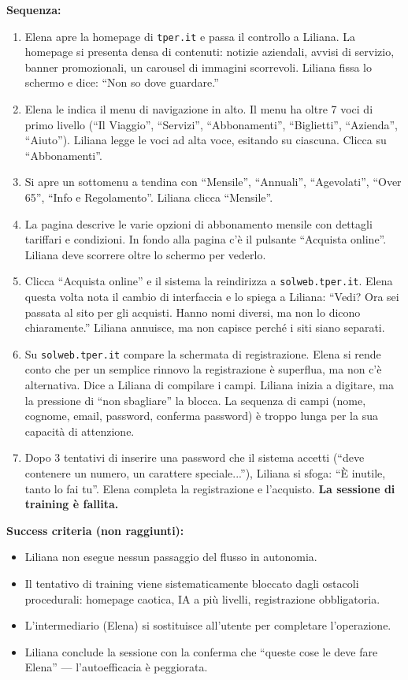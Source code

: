 \documentclass[11pt,a4paper]{article}
\begin{document}
\begin{tcolorbox}[colback=backgroundColor,colframe=borderColor,arc=2mm]
{    \textbf{Sequenza:}
    \begin{enumerate}
        \item Elena apre la homepage di \texttt{tper.it} e passa il controllo a Liliana. La homepage si presenta densa di contenuti: notizie aziendali, avvisi di servizio, banner promozionali, un carousel di immagini scorrevoli. Liliana fissa lo schermo e dice: ``Non so dove guardare.''
        \item Elena le indica il menu di navigazione in alto. Il menu ha oltre 7 voci di primo livello (``Il Viaggio'', ``Servizi'', ``Abbonamenti'', ``Biglietti'', ``Azienda'', ``Aiuto''). Liliana legge le voci ad alta voce, esitando su ciascuna. Clicca su ``Abbonamenti''.
        \item Si apre un sottomenu a tendina con ``Mensile'', ``Annuali'', ``Agevolati'', ``Over 65'', ``Info e Regolamento''. Liliana clicca ``Mensile''.
        \item La pagina descrive le varie opzioni di abbonamento mensile con dettagli tariffari e condizioni. In fondo alla pagina c'è il pulsante ``Acquista online''. Liliana deve scorrere oltre lo schermo per vederlo.
        \item Clicca ``Acquista online'' e il sistema la reindirizza a \texttt{solweb.tper.it}. Elena questa volta nota il cambio di interfaccia e lo spiega a Liliana: ``Vedi? Ora sei passata al sito per gli acquisti. Hanno nomi diversi, ma non lo dicono chiaramente.'' Liliana annuisce, ma non capisce perché i siti siano separati.
        \item Su \texttt{solweb.tper.it} compare la schermata di registrazione. Elena si rende conto che per un semplice rinnovo la registrazione è superflua, ma non c'è alternativa. Dice a Liliana di compilare i campi. Liliana inizia a digitare, ma la pressione di ``non sbagliare'' la blocca. La sequenza di campi (nome, cognome, email, password, conferma password) è troppo lunga per la sua capacità di attenzione.
        \item Dopo 3 tentativi di inserire una password che il sistema accetti (``deve contenere un numero, un carattere speciale...''), Liliana si sfoga: ``È inutile, tanto lo fai tu''. Elena completa la registrazione e l'acquisto. \textbf{La sessione di training è fallita.}
    \end{enumerate}

    \textbf{Success criteria (non raggiunti):}
    \begin{itemize}
        \item Liliana non esegue nessun passaggio del flusso in autonomia.
        \item Il tentativo di training viene sistematicamente bloccato dagli ostacoli procedurali: homepage caotica, IA a più livelli, registrazione obbligatoria.
        \item L'intermediario (Elena) si sostituisce all'utente per completare l'operazione.
        \item Liliana conclude la sessione con la conferma che ``queste cose le deve fare Elena'' --- l'autoefficacia è peggiorata.
    \end{itemize}

}
\end{tcolorbox}
\end{document}
